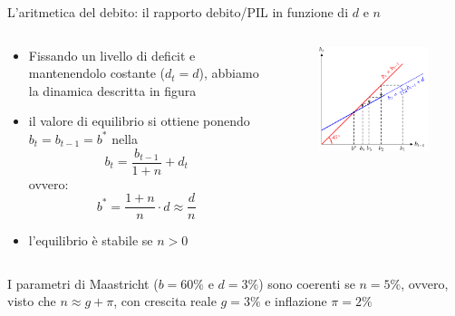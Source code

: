 \documentclass[aspectratio=64,11pt]{beamer}
\begin{document}
\begin{frame}{L'aritmetica del debito: il rapporto debito/PIL in funzione di
    $d$ e $n$}

  \begin{columns}
    \begin{column}{.5\columnwidth}
      \begin{itemize}
      \item Fissando un livello di deficit e mantenendolo costante
        ($d_{t}=d$), abbiamo la dinamica descritta in figura
      \item il valore di equilibrio si ottiene ponendo $b_{t}=b_{t-1}=b^*$
        nella
        \begin{equation*}
          b_{t}=\frac{b_{t-1}}{1+n}+d_{t}
        \end{equation*}
        ovvero:
        \begin{equation*}
          b^*=\frac{1+n}{n}\cdot d \approx \frac{d}{n}
        \end{equation*}
      \item l'equilibrio è stabile se $n>0$
      \end{itemize}
    \end{column}

    \begin{column}{.5\columnwidth}
      \begin{figure}
        \centering
        \includegraphics[width=\textwidth]{./figure/debito-pubblico-sost-1.pdf}
      \end{figure}
    \end{column}
  \end{columns}
  
\begin{block}{}
  I parametri di Maastricht ($b=60\%$ e $d=3\%$) sono coerenti se $n=5\%$,
  ovvero, visto che $n\approx g + \pi$, con crescita reale $g=3\%$ e
  inflazione $\pi=2\%$
\end{block}

\end{frame}
\end{document}
